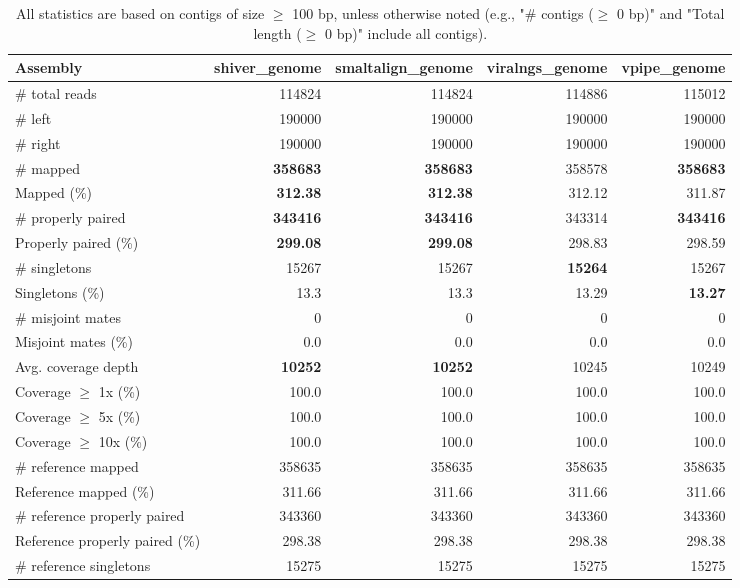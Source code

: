 \documentclass[12pt,a4paper]{article}
\begin{document}
\begin{table}[ht]
\begin{center}
\caption{All statistics are based on contigs of size $\geq$ 100 bp, unless otherwise noted (e.g., "\# contigs ($\geq$ 0 bp)" and "Total length ($\geq$ 0 bp)" include all contigs).}
\begin{tabular}{|l*{4}{|r}|}
\hline
Assembly & shiver\_genome & smaltalign\_genome & viralngs\_genome & vpipe\_genome \\ \hline
\# total reads & 114824 & 114824 & 114886 & 115012 \\ \hline
\# left & 190000 & 190000 & 190000 & 190000 \\ \hline
\# right & 190000 & 190000 & 190000 & 190000 \\ \hline
\# mapped & {\bf 358683} & {\bf 358683} & 358578 & {\bf 358683} \\ \hline
Mapped (\%) & {\bf 312.38} & {\bf 312.38} & 312.12 & 311.87 \\ \hline
\# properly paired & {\bf 343416} & {\bf 343416} & 343314 & {\bf 343416} \\ \hline
Properly paired (\%) & {\bf 299.08} & {\bf 299.08} & 298.83 & 298.59 \\ \hline
\# singletons & 15267 & 15267 & {\bf 15264} & 15267 \\ \hline
Singletons (\%) & 13.3 & 13.3 & 13.29 & {\bf 13.27} \\ \hline
\# misjoint mates & 0 & 0 & 0 & 0 \\ \hline
Misjoint mates (\%) & 0.0 & 0.0 & 0.0 & 0.0 \\ \hline
Avg. coverage depth & {\bf 10252} & {\bf 10252} & 10245 & 10249 \\ \hline
Coverage $\geq$ 1x (\%) & 100.0 & 100.0 & 100.0 & 100.0 \\ \hline
Coverage $\geq$ 5x (\%) & 100.0 & 100.0 & 100.0 & 100.0 \\ \hline
Coverage $\geq$ 10x (\%) & 100.0 & 100.0 & 100.0 & 100.0 \\ \hline
\# reference mapped & 358635 & 358635 & 358635 & 358635 \\ \hline
Reference mapped (\%) & 311.66 & 311.66 & 311.66 & 311.66 \\ \hline
\# reference properly paired & 343360 & 343360 & 343360 & 343360 \\ \hline
Reference properly paired (\%) & 298.38 & 298.38 & 298.38 & 298.38 \\ \hline
\# reference singletons & 15275 & 15275 & 15275 & 15275 \\ \hline

\end{tabular}
\end{center}
\end{table}
\end{document}
